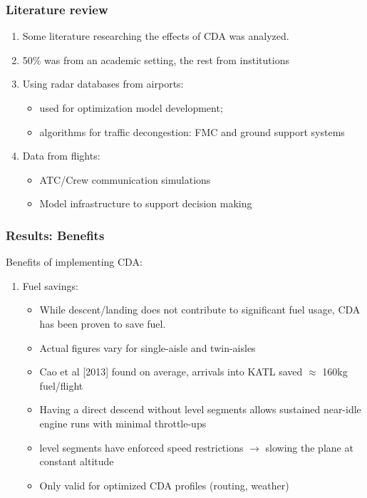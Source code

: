 \documentclass{beamer}
\begin{document}
\begin{frame}
\frametitle{Literature review}

\begin{enumerate}[1]

\item Some literature researching the effects of CDA was analyzed.

\item 50\% was from an academic setting, the rest from institutions

\item Using radar databases from airports:

\begin{itemize}
\item used for optimization model development; 
\item algorithms for traffic decongestion: FMC and ground support systems
\end{itemize}

\item Data from flights:

\begin{itemize}
\item ATC/Crew communication simulations
\item Model infrastructure to support decision making
\end{itemize}

\end{enumerate}

\end{frame}




\begin{frame}
\frametitle{Results: Benefits}

Benefits of implementing CDA:
\begin{enumerate}[1.]

\item Fuel savings:
\begin{itemize}
\item While descent/landing does not contribute to significant fuel usage, CDA has been proven to save fuel.	
\item Actual figures vary for single-aisle and twin-aisles
\item Cao et al [2013] found on average, arrivals into KATL saved $\approx$ 160kg fuel/flight 
\item Having a direct descend without level segments allows sustained near-idle engine runs with minimal throttle-ups 
\item level segments have enforced speed restrictions $\rightarrow$ slowing the plane at constant altitude
\item Only valid for optimized CDA profiles (routing, weather)
\end{itemize}
\end{enumerate}
\end{frame}
\end{document}
